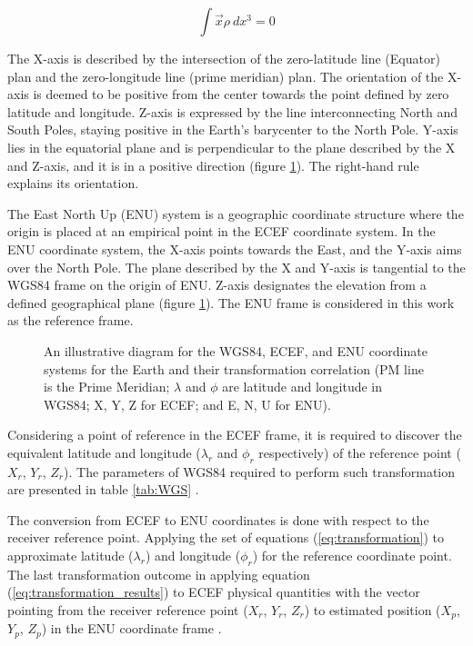 \begin{equation}
    \int \overrightarrow{x}\rho~dx^3 = 0
    \label{eq:ecef}
\end{equation}

The X-axis is described by the intersection of the zero-latitude line (Equator) plan and the zero-longitude line (prime meridian) plan. The orientation of the X-axis is deemed to be positive from the center towards the point defined by zero latitude and longitude. Z-axis is expressed by the line interconnecting North and South Poles, staying positive in the Earth's barycenter to the North Pole. Y-axis lies in the equatorial plane and is perpendicular to the plane described by the X and Z-axis, and it is in a positive direction (figure \ref{fig:ECEF}). The right-hand rule explains its orientation.

The East North Up (ENU) system is a geographic coordinate structure where the origin is placed at an empirical point in the ECEF coordinate system. In the ENU coordinate system, the X-axis points towards the East, and the Y-axis aims over the North Pole. The plane described by the X and Y-axis is tangential to the WGS84 frame on the origin of ENU. Z-axis designates the elevation from a defined geographical plane (figure \ref{fig:ECEF}). The ENU frame is considered in this work as the reference frame.

\begin{figure}[!h]
    \centering
    \resizebox{0.70\linewidth}{!}{}
    \caption{An illustrative diagram for the WGS84, ECEF, and ENU coordinate systems for the Earth and their transformation correlation (PM line is the Prime Meridian; $\lambda$ and $\phi$ are latitude and longitude in WGS84; X, Y, Z for ECEF; and E, N, U for ENU).  }
    \label{fig:ECEF}
\end{figure}

Considering a point of reference in the ECEF frame, it is required to discover the equivalent latitude and longitude ($\lambda_r$ and $\phi_r$ respectively) of the reference point ($X_r$, $Y_r$, $Z_r$). The parameters of WGS84 required to perform such transformation are presented in table \ref{tab:WGS} \cite{soler1988coordinate}.



The conversion from ECEF to ENU coordinates is done with respect to the receiver reference point. Applying the set of equations (\ref{eq:transformation}) to approximate latitude ($\lambda_r$) and longitude ($\phi_r$) for the reference coordinate point. The last transformation outcome in applying equation (\ref{eq:transformation_results}) to ECEF physical quantities with the vector pointing from the receiver reference point ($X_r$, $Y_r$, $Z_r$) to estimated position ($X_p$, $Y_p$, $Z_p$) in the ENU coordinate frame \cite{boucher2001itrs}.


